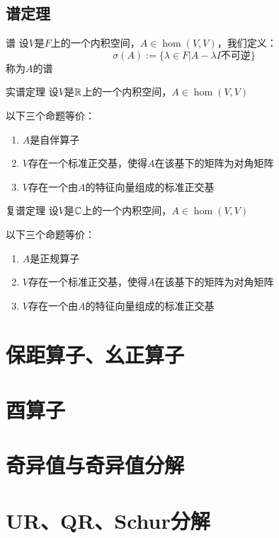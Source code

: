 \documentclass[12pt, a4paper, oneside, UTF8]{ctexbook}
\begin{document}
		\subsection{谱定理}
			\begin{defn}{谱}{}
				设$V$是$F$上的一个内积空间，$A \in \hom(V,V)$，我们定义：
				\begin{equation}
					\sigma (A) := \{\lambda \in F| A-\lambda I \text{不可逆}\}
				\end{equation}
				称为$A$的谱
			\end{defn}
			\begin{them}{实谱定理}{}
				设$V$是$\mathbb{R}$上的一个内积空间，$A \in \hom(V,V)$

				以下三个命题等价：
				\begin{enumerate}
					\item $A$是自伴算子
					\item $V$存在一个标准正交基，使得$A$在该基下的矩阵为对角矩阵
					\item $V$存在一个由$A$的特征向量组成的标准正交基
				\end{enumerate}
			\end{them}
			\begin{them}{复谱定理}{}
				设$V$是$\mathbb{C}$上的一个内积空间，$A \in \hom(V,V)$

				以下三个命题等价：
				\begin{enumerate}
					\item $A$是正规算子
					\item $V$存在一个标准正交基，使得$A$在该基下的矩阵为对角矩阵
					\item $V$存在一个由$A$的特征向量组成的标准正交基
				\end{enumerate}
			\end{them}
	\section{保距算子、幺正算子}
	\section{酉算子}
	\section{奇异值与奇异值分解}
	\section{UR、QR、Schur分解}
\ifx\allfiles\undefined
\end{document}
